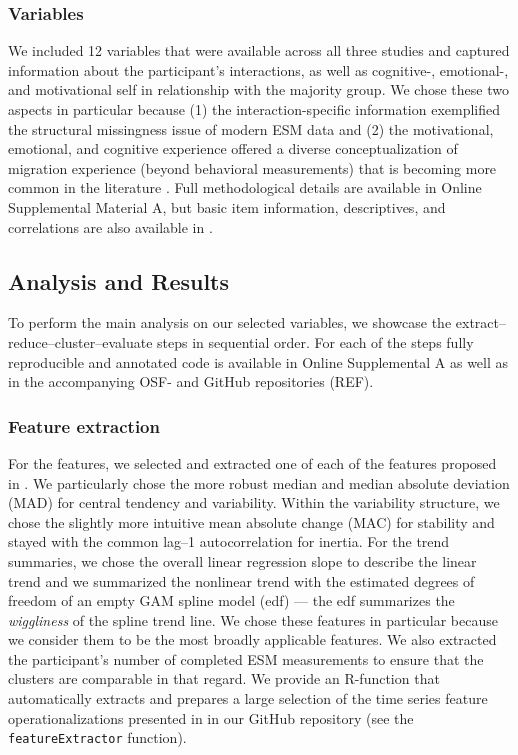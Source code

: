 \subsubsection{Variables}

We included 12 variables that were available across all three studies
and captured information about the participant's interactions, as well
as cognitive-, emotional-, and motivational self in relationship with
the majority group. We chose these two aspects in particular because (1)
the interaction-specific information exemplified the structural
missingness issue of modern ESM data and (2) the motivational,
emotional, and cognitive experience offered a diverse conceptualization
of migration experience (beyond behavioral measurements) that is
becoming more common in the literature \citep[][]{Kreienkamp2022d}. Full
methodological details are available in Online Supplemental Material A,
but basic item information, descriptives, and correlations are also
available in .



\subsection{Analysis and Results}

To perform the main analysis on our selected variables, we showcase the
extract--reduce--cluster--evaluate steps in sequential order. For each
of the steps fully reproducible and annotated code is available in
Online Supplemental A as well as in the accompanying OSF- and GitHub
repositories (REF).

\subsubsection{Feature extraction}

For the features, we selected and extracted one of each of the features
proposed in . We particularly chose the more
robust median and median absolute deviation (MAD) for central tendency
and variability. Within the variability structure, we chose the slightly
more intuitive mean absolute change (MAC) for stability and stayed with
the common lag--1 autocorrelation for inertia. For the trend summaries,
we chose the overall linear regression slope to describe the linear
trend and we summarized the nonlinear trend with the estimated degrees
of freedom of an empty GAM spline model (edf) --- the edf summarizes the
\textit{wiggliness} of the spline trend line. We chose these features in
particular because we consider them to be the most broadly applicable
features. We also extracted the participant's number of completed ESM
measurements to ensure that the clusters are comparable in that regard.
We provide an R-function that automatically extracts and prepares a
large selection of the time series feature operationalizations presented
in  in our GitHub repository (see the
\texttt{featureExtractor} function).

